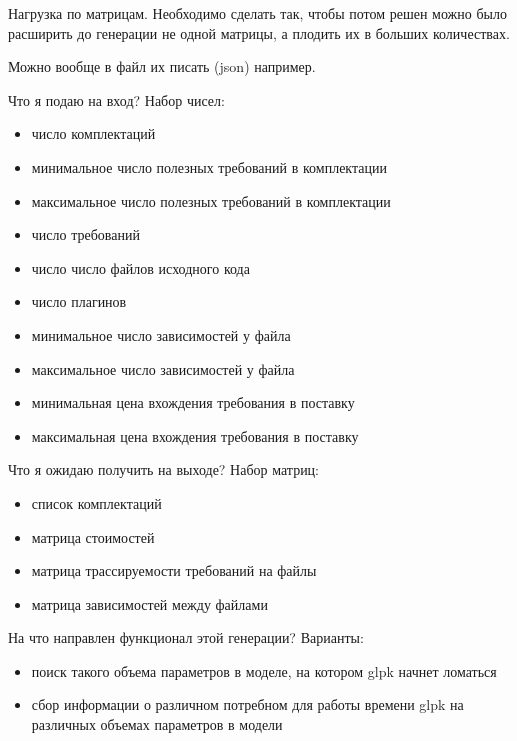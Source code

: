\documentclass{article}
\begin{document}
  Нагрузка по матрицам. Необходимо сделать так, чтобы потом решен можно было расширить до генерации не одной матрицы, а плодить их в больших количествах.

  Можно вообще в файл их писать (json) например.

  Что я подаю на вход?
  Набор чисел:
  \begin{itemize}
    \item число комплектаций
    \item минимальное число полезных требований в комплектации
    \item максимальное число полезных требований в комплектации
    \item число требований
    \item число число файлов исходного кода
    \item число плагинов
    \item минимальное число зависимостей у файла
    \item максимальное число зависимостей у файла
    \item минимальная цена вхождения требования в поставку
    \item максимальная цена вхождения требования в поставку
  \end{itemize}

  Что я ожидаю получить на выходе?
  Набор матриц:
  \begin{itemize}
    \item список комплектаций
    \item матрица стоимостей
    \item матрица трассируемости требований на файлы
    \item матрица зависимостей между файлами
  \end{itemize}

  На что направлен функционал этой генерации?
  Варианты:
  \begin{itemize}
    \item поиск такого объема параметров в моделе, на котором glpk начнет ломаться
    \item сбор информации о различном потребном для работы времени glpk на различных объемах параметров в модели
  \end{itemize}

  
  
\end{document}
